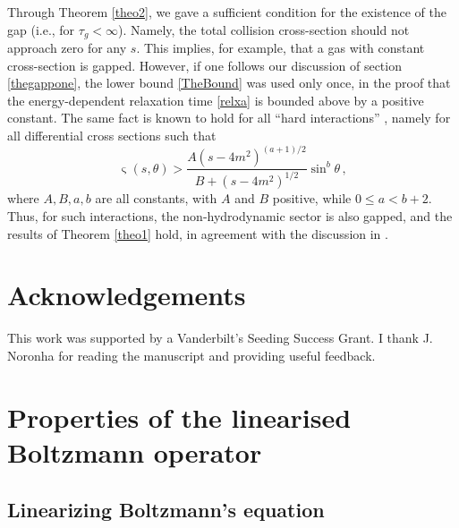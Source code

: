\documentclass[a4paper, amsfonts, amssymb, amsmath, reprint, showkeys, nofootinbib, twoside, onecolumn,notitlepage]{revtex4-2}
\theoremstyle{definition}
\theoremstyle{theorem}
\theoremstyle{corollary}
\begin{document}
Through Theorem \ref{theo2}, we gave a sufficient condition for the existence of the gap (i.e., for $\tau_g<\infty$). Namely, the total collision cross-section should not approach zero for any $s$. This implies, for example, that a gas with constant cross-section is gapped. However, if one follows our discussion of section \ref{thegappone}, the lower bound \eqref{TheBound} was used only once, in the proof that the energy-dependent relaxation time \eqref{relxa} is bounded above by a positive constant. The same fact is known to hold for all ``hard interactions'' \cite[Theorem 4.1.A]{Dudynski1988}, namely for all differential cross sections such that
\begin{equation}
\upvarsigma(s,\theta) > \dfrac{A (s{-}4m^2)^{(a+1)/2}}{B+(s{-}4m^2)^{1/2}}\sin^{b}\theta \, ,
\end{equation}
where $A,B,a,b$ are all constants, with $A$ and $B$ positive, while $0\leq a < b{+}2$. Thus, for such interactions, the non-hydrodynamic sector is also gapped, and the results of Theorem \ref{theo1} hold, in agreement with the discussion in \cite{Dudynski1989}.


\section*{Acknowledgements}

This work was supported by a Vanderbilt's Seeding Success Grant. I thank J. Noronha for reading the manuscript and providing useful feedback.






\appendix



\section{Properties of the linearised Boltzmann operator}\label{proproiuzzione}


\subsection{Linearizing Boltzmann's equation}
\end{document}
